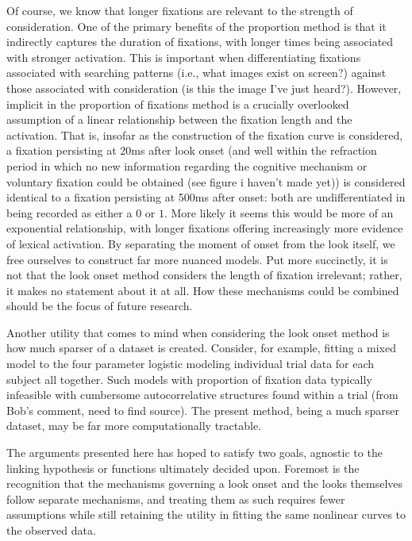 Of course, we know that longer fixations are relevant to the strength of consideration. One of the primary benefits of the proportion method is that it indirectly captures the duration of fixations, with longer times being associated with stronger activation. This is important when differentiating fixations associated with searching patterns (i.e., what images exist on screen?) against those associated with consideration (is this the image I've just heard?). However, implicit in the proportion of fixations method is a crucially overlooked assumption of a linear relationship between the fixation length and the activation. That is, insofar as the construction of the fixation curve is considered, a fixation persisting at 20ms after look onset (and well within the refraction period in which no new information regarding the cognitive mechanism or voluntary fixation could be obtained (see figure i haven't made yet)) is considered identical to a fixation persisting at 500ms after onset: both are undifferentiated in being recorded as either a $0$ or $1$. More likely it seems this would be more of an exponential relationship, with longer fixations offering increasingly more evidence of lexical activation. By separating the moment of onset from the look itself, we free ourselves to construct far more nuanced models. Put more succinctly, it is not that the look onset method considers the length of fixation irrelevant; rather, it makes no statement about it at all. How these mechanisms could be combined should be the focus of future research.

Another utility that comes to mind when considering the look onset method is how much sparser of a dataset is created. Consider, for example, fitting a mixed model to the four parameter logistic modeling individual trial data for each subject all together. Such models with proportion of fixation data typically infeasible with cumbersome autocorrelative structures found within a trial (from Bob's comment, need to find source). The present method, being a much sparser dataset, may be far more computationally tractable. 


The arguments presented here has hoped to satisfy two goals, agnostic to the linking hypothesis or functions ultimately decided upon. Foremost is the recognition that the mechanisms governing a look onset and the looks themselves follow separate mechanisms, and treating them as such requires fewer assumptions while still retaining the utility in fitting the same nonlinear curves to the observed data.

